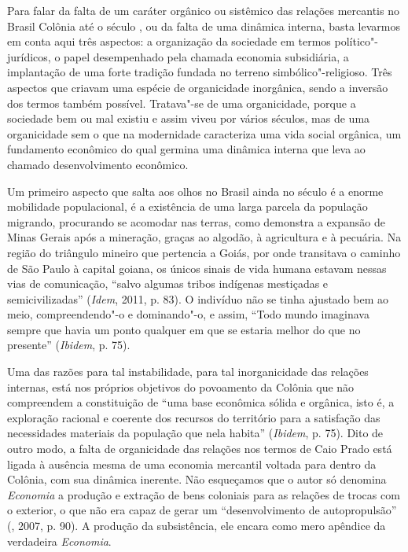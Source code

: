 Para falar da falta de um caráter orgânico ou sistêmico das relações
mercantis no Brasil Colônia até o século , ou da falta de uma
dinâmica interna, basta levarmos em conta aqui três aspectos: a
organização da sociedade em termos político"-jurídicos, o papel
desempenhado pela chamada economia subsidiária, a implantação de uma
forte tradição fundada no terreno simbólico"-religioso. Três aspectos que
criavam uma espécie de organicidade inorgânica, sendo a inversão dos
termos também possível. Tratava"-se de uma organicidade, porque a
sociedade bem ou mal existiu e assim viveu por vários séculos,
mas de uma organicidade sem o que na modernidade caracteriza
uma vida social orgânica, um fundamento econômico do qual germina uma
dinâmica interna que leva ao chamado desenvolvimento econômico.

Um primeiro aspecto que salta aos olhos no Brasil ainda no século  é
a enorme mobilidade populacional, é a existência de uma larga parcela da
população migrando, procurando se acomodar nas terras, como demonstra a
expansão de Minas Gerais após a mineração, graças ao algodão, à
agricultura e à pecuária. Na região do triângulo mineiro que pertencia a
Goiás, por onde transitava o caminho de São Paulo à capital goiana, os
únicos sinais de vida humana estavam nessas vias de comunicação, ``salvo
algumas tribos indígenas mestiçadas e semicivilizadas'' (\emph{Idem},
2011, p. 83). O indivíduo não se tinha ajustado bem ao meio,
compreendendo"-o e dominando"-o, e assim, ``Todo mundo imaginava sempre
que havia um ponto qualquer em que se estaria melhor do que no
presente'' (\emph{Ibidem}, p. 75).

Uma das razões para tal instabilidade, para tal inorganicidade das
relações internas, está nos próprios objetivos do povoamento da Colônia
que não compreendem a constituição de ``uma base econômica sólida e
orgânica, isto é, a exploração racional e coerente dos recursos do
território para a satisfação das necessidades materiais da população que
nela habita'' (\emph{Ibidem}, p. 75). Dito de outro modo, a falta
de organicidade das relações nos termos de Caio Prado está ligada à
ausência mesma de uma economia mercantil voltada para dentro da Colônia,
com sua dinâmica inerente. Não esqueçamos que o autor só denomina
\emph{Economia} a produção e extração de bens coloniais para as relações
de trocas com o exterior, o que não era capaz de gerar um
``desenvolvimento de autopropulsão'' (, 2007, p. 90). A produção
da subsistência, ele encara como mero apêndice da verdadeira
\emph{Economia}.

